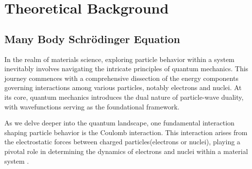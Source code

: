 

\chapter{Theoretical Background} %

\label{Chapter2} %


\section{Many Body Schrödinger Equation}
\label{section.schorödinger_equation}
In the realm of materials science, exploring particle behavior within a system inevitably involves navigating the intricate principles of quantum mechanics. This journey commences with a comprehensive dissection of the energy components governing interactions among various particles, notably electrons and nuclei. At its core, quantum mechanics introduces the dual nature of particle-wave duality, with wavefunctions serving as the foundational framework.

As we delve deeper into the quantum landscape, one fundamental interaction shaping particle behavior is the Coulomb interaction. This interaction arises from the electrostatic forces between charged particles(electrons or nuclei), playing a pivotal role in determining the dynamics of electrons and nuclei within a material system \supercite{Giustino2014,Sholl2009}.

